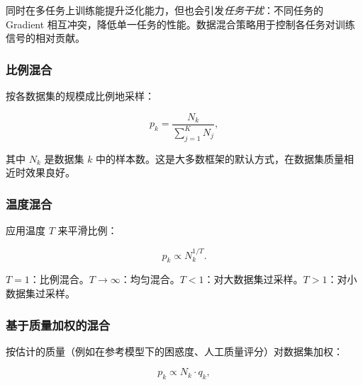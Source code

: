 \begin{intuitionbox}[多任务挑战]
同时在多任务上训练能提升泛化能力，但也会引发\emph{任务干扰}：不同任务的 Gradient 相互冲突，降低单一任务的性能。数据混合策略用于控制各任务对训练信号的相对贡献。
\end{intuitionbox}

\subsubsection*{比例混合}
\label{proportional-mixing}

按各数据集的规模成比例地采样：

\[
p_k = \frac{N_k}{\sum_{j=1}^K N_j},
\]

其中 $N_k$ 是数据集 $k$ 中的样本数。这是大多数框架的默认方式，在数据集质量相近时效果良好。

\subsubsection*{温度混合}
\label{temperature-mixing}

应用温度 $T$ 来平滑比例：

\[
p_k \propto N_k^{1/T}.
\]

$T=1$：比例混合。$T \to \infty$：均匀混合。$T < 1$：对大数据集过采样。$T > 1$：对小数据集过采样。

\subsubsection*{基于质量加权的混合}
\label{quality-weighted-mixing}

按估计的质量（例如在参考模型下的困惑度、人工质量评分）对数据集加权：

\[
p_k \propto N_k \cdot q_k,
\]

